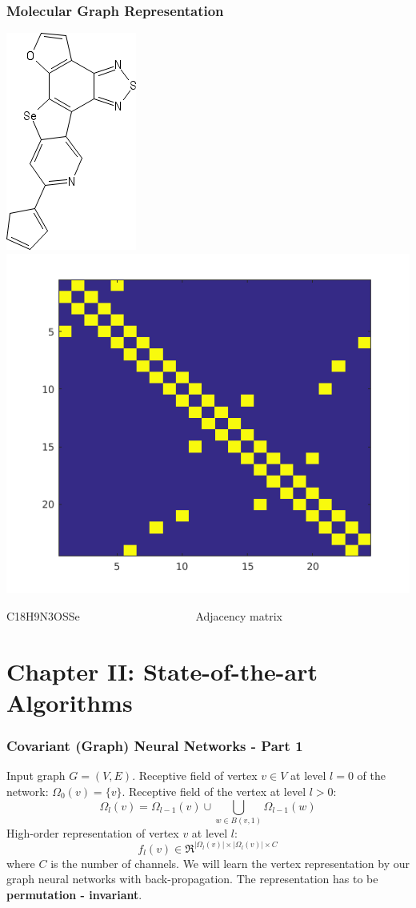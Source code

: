 \documentclass{beamer}
\begin{document}
\begin{frame}
\frametitle{Molecular Graph Representation}
\begin{justify}
\begin{center}
	\includegraphics[scale=0.5]{sketcher}
	\includegraphics[scale=0.5]{adjacency}
\end{center}
C18H9N3OSSe \ \ \ \ \ \ \ \ \ \ \ \ \ \ \ \ \ \ \ \ Adjacency matrix
\end{justify}
\end{frame}

\section{Chapter II: State-of-the-art Algorithms}

\begin{frame}
\frametitle{Covariant (Graph) Neural Networks - Part 1}
Input graph $G = (V, E)$. Receptive field of vertex $v \in V$ at level $l = 0$ of the network: $\Omega_0(v) = \{v\}$. Receptive field of the vertex at level $l > 0$:
$$\Omega_l(v) = \Omega_{l - 1}(v) \cup \bigcup\limits_{w \in B(v, 1)} \Omega_{l - 1}(w)$$
High-order representation of vertex $v$ at level $l$:
$$f_l(v) \in \Re^{|\Omega_l(v)| \times |\Omega_l(v)| \times C}$$
where $C$ is the number of channels. We will learn the vertex representation by our graph neural networks with back-propagation. The representation has to be \textbf{permutation - invariant}.
\end{frame}
\end{document}
